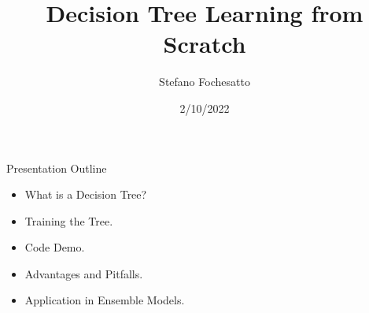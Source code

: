 \documentclass[xcolor={svgnames},
               hyperref={colorlinks,citecolor=DeepPink4,linkcolor=FireBrick,urlcolor=Maroon}]
               {beamer}
\title{Decision Tree Learning from Scratch}
\author{Stefano Fochesatto}
\institute[UAF]{MATH 692 Mathematics for Machine Learning}
\date[Spring 2022]{2/10/2022}
\begin{document}
\beamertemplatenavigationsymbolsempty

\begin{frame}
  \maketitle
\end{frame}

\begin{frame}{Presentation Outline}
  \begin{itemize}
  \item What is a Decision Tree?
  \vfill
  \item Training the Tree.
  \vfill
  \item Code Demo.
  \vfill
  \item Advantages and Pitfalls.
  \vfill
  \item Application in Ensemble Models.
  \end{itemize}
\end{frame}
\end{document}
